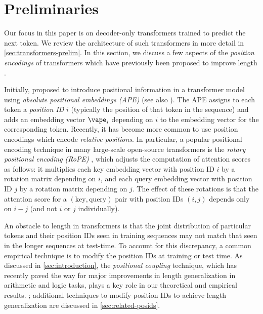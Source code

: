 \documentclass{article}
\newcommand{\arxiv}[1]{\iftoggle{icml}{}{#1}}
\newcommand{\icml}[1]{\iftoggle{icml}{#1}{}}
\begin{document}
\section{Preliminaries}
Our focus in this paper is on decoder-only transformers trained to predict the next token. We review the architecture of such transformers in more detail in \cref{sec:transformers-prelim}. In this section, we discuss a few aspects of the \emph{position encodings} of transformers which have previously been proposed to improve length \generalization.

Initially, \citet{vaswani_attention_2023} proposed to introduce positional information in a transformer model using \emph{absolute positional embeddings (APE)} (see also \citet{gehring_convolutional_2017}). The APE assigns to each token a \emph{position ID} $i$ (typically the position of that token in the sequence) and adds an embedding vector $\vape_i$ depending on $i$ to the embedding vector for the corresponding token. %
Recently, it has become more common to use position encodings which encode \emph{relative positions}. In particular, a popular positional encoding technique in many large-scale open-source transformers is the \emph{rotary positional encoding (RoPE)} \cite{su_roformer_2023}, which adjusts the computation of attention scores as follows: it multiplies each key embedding vector with position ID $i$ by a rotation matrix depending on $i$, and each query embedding vector with position ID $j$ by a rotation matrix depending on $j$. The effect of these rotations is that the attention score for a $(\text{key}, \text{query})$ pair with position IDs $(i,j)$ depends only on $i-j$ (and not $i$ or $j$ individually). 

An obstacle to length \generalization in transformers is that the joint distribution of particular tokens and their position IDs seen in training sequences may not match that seen in the longer sequences at test-time. To account for this discrepancy, a common empirical technique is to modify the position IDs at training or test time. As discussed in \cref{sec:introduction}, the \emph{positional coupling} technique, which has recently paved the way for major improvements in length generalization in arithmetic and logic tasks, plays a key role in our theoretical and empirical results. \icml{We discuss it next}\arxiv{We discuss it as well as another tecnique which will play a role in our experiments, \emph{PoSE}, next}; additional techniques to modify position IDs to achieve length generalization are discussed in \cref{sec:related-posids}. 
\end{document}
